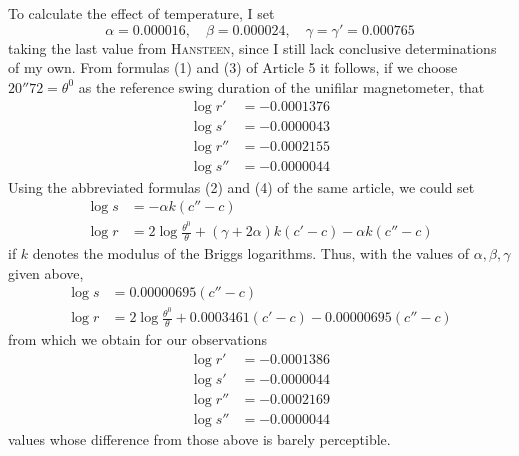 To calculate the effect of temperature, I set
\[
\alpha=0.000016,\quad\beta=0.000024,\quad\gamma=\gamma'=0.000765
\]
taking the last value from \textsc{Hansteen}, since I still lack conclusive determinations of my own. From formulas (1) and (3) of Article 5 it follows, if we choose $20''72=\theta^0$ as the reference swing duration of the unifilar magnetometer, that
\[
\begin{aligned}
\log r'&=-0.0001376\\
\log s'&=-0.0000043\\
\log r''&=-0.0002155\\
\log s''&=-0.0000044
\end{aligned}
\]
Using the abbreviated formulas (2) and (4) of the same article, we could set
\[
\begin{aligned}
\log s&=-\alpha k(c''-c)\\
\log r&=2\log\frac{\theta^0}{\theta}+(\gamma+2\alpha)k(c'-c)-\alpha k(c''-c)
\end{aligned}
\]
if $k$ denotes the modulus of the Briggs logarithms. Thus, with the values of $\alpha,\beta,\gamma$ given above,
\[
\begin{aligned}
\log s&=0.00000695(c''-c)\\
\log r&=2\log\frac{\theta^0}{\theta}+0.0003461(c'-c)-0.00000695(c''-c)
\end{aligned}
\]
from which we obtain for our observations
\[
\begin{aligned}
\log r'&=-0.0001386\\
\log s'&=-0.0000044\\
\log r''&=-0.0002169\\
\log s''&=-0.0000044
\end{aligned}
\]
values whose difference from those above is barely perceptible.

